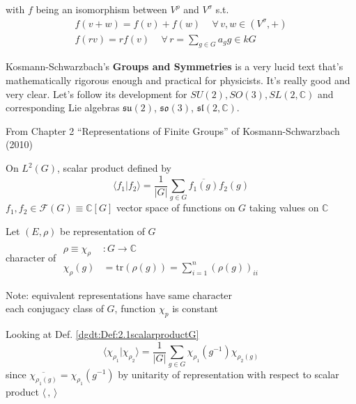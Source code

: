 with $f$ being an isomorphism between $V^{\rho}$ and $V^{\sigma}$ s.t. 
\[
\begin{gathered}
f(v+w) = f(v) + f(w) \quad \, \forall \, v,w \in (V^{\sigma},+) \\ 
f(rv) = rf(v) \quad \, \forall \, r  = \sum_{g \in G} a_g g \in kG
\end{gathered}
\]

Kosmann-Schwarzbach's \textbf{Groups and Symmetries}\cite{dgdt:YKosmann-Schwarzbach2010} is a very lucid text that's mathematically rigorous enough and practical for physicists.  It's really good and very clear.  Let's follow its development for $SU(2), SO(3), SL(2,\mathbb{C})$ and corresponding Lie algebras $\mathfrak{su}(2)$, $\mathfrak{so}(3)$, $\mathfrak{sl}(2,\mathbb{C})$.  

From Chapter 2 ``Representations of Finite Groups'' of Kosmann-Schwarzbach (2010) \cite{dgdt:YKosmann-Schwarzbach2010}

\begin{definition} \label{dgdt:Def:2.1scalarproductG}
	On $L^2(G)$, scalar product defined by 
	\[
	\langle f_1 | f_2 \rangle = \frac{1}{|G|} \sum_{g\in G} \overline{f_1(g)} f_2(g)
	\]
	$f_1,f_2 \in \mathcal{F}(G) \equiv \mathbb{C}[G]$ vector space of functions on $G$ taking values on $\mathbb{C}$
\end{definition}

\begin{definition}
	Let $(E,\rho)$ be representation of $G$ \\
	character of $\begin{aligned} & \quad \\ 
	\rho \equiv \chi_{\rho} & : G \to \mathbb{C} \\
	\chi_{\rho}(g) & = \text{tr}( \rho(g)) = \sum_{i=1}^n (\rho(g))_{ii} \end{aligned}$ 
	
	Note: equivalent representations have same character \\
	each conjugacy class of $G$, function $\chi_p$ is constant
\end{definition}

Looking at Def. \ref{dgdt:Def:2.1scalarproductG}
\[
\langle \chi_{\rho_1} | \chi_{\rho_2} \rangle = \frac{1}{|G| } \sum_{g\in G} \chi_{\rho_1}(g^{-1}) \chi_{\rho_2(g)}
\]
since $\overline{\chi_{\rho_1(g)}} = \chi_{\rho_1}(g^{-1})$ by unitarity of representation with respect to scalar product $\langle \, , \, \rangle$

